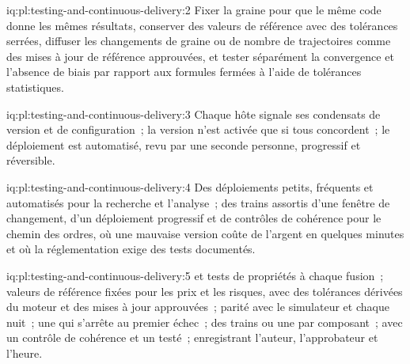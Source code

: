 \begin{solution}{iq:pl:testing-and-continuous-delivery:2}
Fixer la graine pour que le même code donne les mêmes résultats, conserver des valeurs de référence avec des tolérances serrées, diffuser les changements de graine ou de nombre de trajectoires comme
des mises à jour de référence approuvées, et tester séparément la convergence et l'absence de biais par rapport aux formules fermées à l'aide de tolérances statistiques.
\end{solution}

\begin{solution}{iq:pl:testing-and-continuous-delivery:3}
Chaque hôte signale ses condensats de version et de configuration~; la version n'est activée que si tous concordent~; le déploiement est automatisé, revu
par une seconde personne, progressif et réversible.
\end{solution}

\begin{solution}{iq:pl:testing-and-continuous-delivery:4}
Des déploiements petits, fréquents et automatisés pour la recherche et l'analyse~; des trains assortis d'une fenêtre de changement, d'un déploiement progressif et de contrôles de cohérence pour le
chemin des ordres, où une mauvaise version coûte de l'argent en quelques minutes et où la réglementation exige des tests documentés.
\end{solution}

\begin{solution}{iq:pl:testing-and-continuous-delivery:5}
 et tests de propriétés à chaque fusion~; valeurs de référence fixées pour les prix et les risques, avec des tolérances dérivées du moteur et des mises à jour approuvées~;
parité avec le simulateur et  chaque nuit~; une  qui s'arrête au premier échec~; des trains ou une  par composant~;
 avec un contrôle de cohérence et un  testé~;  enregistrant l'auteur, l'approbateur et l'heure.
\end{solution}
